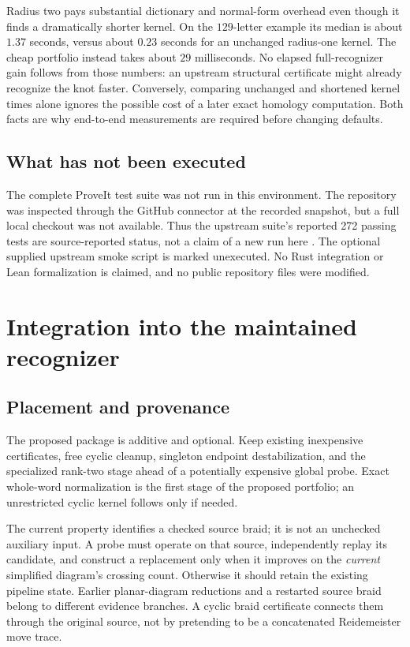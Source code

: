 \documentclass[11pt,a4paper]{article}
\theoremstyle{definition}\newtheorem{definition}[theorem]{Definition}
\theoremstyle{remark}\newtheorem{remark}[theorem]{Remark}
\newcommand{\code}[1]{\texttt{\detokenize{#1}}}
\begin{document}
Radius two pays substantial dictionary and normal-form overhead even though
it finds a dramatically shorter kernel. On the $129$-letter example its
median is about $1.37$ seconds, versus about $0.23$ seconds for an unchanged
radius-one kernel. The cheap portfolio instead takes about $29$ milliseconds.
No elapsed full-recognizer gain follows from those numbers: an upstream
structural certificate might already recognize the knot faster. Conversely,
comparing unchanged and shortened kernel times alone ignores the possible
cost of a later exact homology computation. Both facts are why end-to-end
measurements are required before changing defaults.

\subsection{What has not been executed}
The complete ProveIt test suite was not run in this environment. The
repository was inspected through the GitHub connector at the recorded
snapshot, but a full local checkout was not available. Thus the upstream
suite's reported 272 passing tests are source-reported status, not a claim
of a new run here \cite{ProveItReadme}. The optional supplied upstream smoke
script is marked unexecuted. No Rust integration or Lean formalization is
claimed, and no public repository files were modified.

\section{Integration into the maintained recognizer}

\subsection{Placement and provenance}
The proposed package is additive and optional. Keep existing inexpensive
certificates, free cyclic cleanup, singleton endpoint destabilization, and
the specialized rank-two stage ahead of a potentially expensive global
probe. Exact whole-word normalization is the first stage of the proposed
portfolio; an unrestricted cyclic kernel follows only if needed.

The current \code{Diagram.braid_source} property identifies a checked source
braid; it is not an unchecked auxiliary input. A probe must operate on that
source, independently replay its candidate, and construct a replacement
\code{Diagram.from_braid} only when it improves on the \emph{current}
simplified diagram's crossing count. Otherwise it should retain the existing
pipeline state. Earlier planar-diagram reductions and a restarted source
braid belong to different evidence branches. A cyclic braid certificate
connects them through the original source, not by pretending to be a
concatenated Reidemeister move trace.
\end{document}
